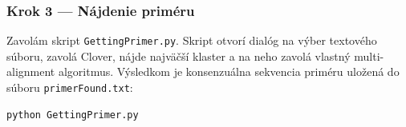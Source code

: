 \subsubsection*{Krok 3 — Nájdenie priméru}
Zavolám skript \texttt{GettingPrimer.py}. Skript otvorí dialóg na výber textového súboru, zavolá Clover, nájde najväčší klaster a na neho zavolá vlastný multi-alignment algoritmus. Výsledkom je konsenzuálna sekvencia priméru uložená do súboru \texttt{primerFound.txt}:
\begin{verbatim}
python GettingPrimer.py
\end{verbatim}
